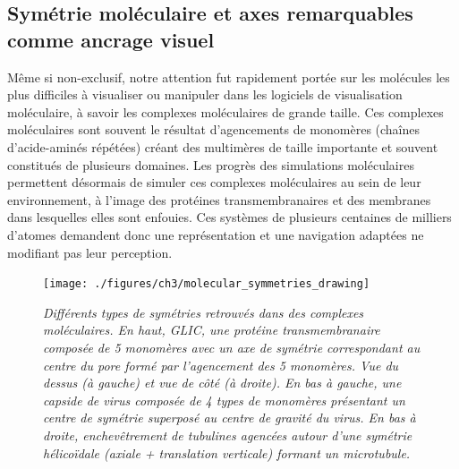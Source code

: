 \subsection{Symétrie moléculaire et axes remarquables comme ancrage visuel}

Même si non-exclusif, notre attention fut rapidement portée sur les molécules les plus difficiles à visualiser ou manipuler dans les logiciels de visualisation moléculaire, à savoir les complexes moléculaires de grande taille. Ces complexes moléculaires sont souvent le résultat d'agencements de monomères (chaînes d'acide-aminés répétées) créant des multimères de taille importante et souvent constitués de plusieurs domaines. Les progrès des simulations moléculaires permettent désormais de simuler ces complexes moléculaires au sein de leur environnement, à l'image des protéines transmembranaires et des membranes dans lesquelles elles sont enfouies. Ces systèmes de plusieurs centaines de milliers d'atomes demandent donc une représentation et une navigation adaptées ne modifiant pas leur perception.

\begin{figure}[h]
  \centering
  {\texttt{[image: ./figures/ch3/molecular\_symmetries\_drawing]}}
    \caption[Types de symétries retrouvées dans l'agencement de complexes protéiques majeurs.]{{\it Différents types de symétries retrouvés dans des complexes moléculaires. En haut, GLIC, une protéine transmembranaire composée de 5 monomères avec un axe de symétrie correspondant au centre du pore formé par l'agencement des 5 monomères. Vue du dessus (à gauche) et vue de côté (à droite). En bas à gauche, une capside de virus composée de 4 types de monomères présentant un centre de symétrie superposé au centre de gravité du virus. En bas à droite, enchevêtrement de tubulines agencées autour d'une symétrie hélicoïdale (axiale + translation verticale) formant un microtubule.}}
  \label{Fig:molecular_symmetries_drawing}
  \hspace{0.2cm}
\end{figure}

